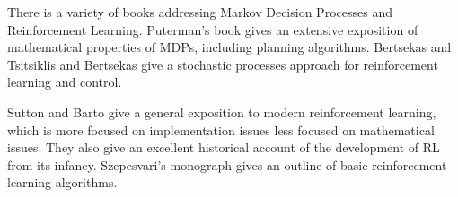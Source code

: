 There is a variety of books addressing Markov Decision Processes and Reinforcement Learning. Puterman's book \cite{puterman2014markov} gives an extensive exposition of mathematical properties of MDPs, including planning algorithms. Bertsekas and Tsitsiklis \cite{BertsekasTsitsiklis96} and Bertsekas \cite{Bertsekas05} give a stochastic processes approach for reinforcement learning and control. 

Sutton and Barto \cite{SuttonB98} give a general exposition to modern reinforcement learning, which is more focused on implementation issues less focused on mathematical issues. They also give an excellent historical account of the development of RL from its infancy. Szepesvari's monograph \cite{Szepesvari} gives an outline of basic reinforcement learning algorithms. 




